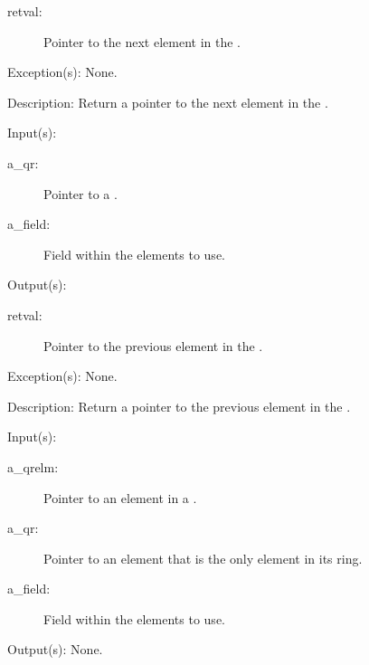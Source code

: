 \begin{capi}
\begin{capilist}
		\begin{description}\item[]
		\item[retval: ]
			Pointer to the next element in the .
		\end{description}
	\item[Exception(s): ] None.
	\item[Description: ]
		Return a pointer to the next element in the .
	\end{capilist}
\label{qr_prev}
	\begin{capilist}
	\item[Input(s): ]
		\begin{description}\item[]
		\item[a\_qr: ]
			Pointer to a .
		\item[a\_field: ]
			Field within the  elements to use.
		\end{description}
	\item[Output(s): ]
		\begin{description}\item[]
		\item[retval: ]
			Pointer to the previous element in the .
		\end{description}
	\item[Exception(s): ] None.
	\item[Description: ]
		Return a pointer to the previous element in the .
	\end{capilist}
\label{qr_before_insert}
	\begin{capilist}
	\item[Input(s): ]
		\begin{description}\item[]
		\item[a\_qrelm: ]
			Pointer to an element in a \classname{qr}.
		\item[a\_qr: ]
			Pointer to an element that is the only element in its
			ring.
		\item[a\_field: ]
			Field within the  elements to use.
		\end{description}
	\item[Output(s): ] None.

\end{capilist}
\end{capi}
